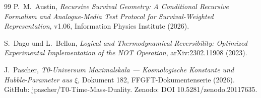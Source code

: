 \begin{thebibliography}{99}
P.~M.~Austin,
\textit{Recursive Survival Geometry: A Conditional Recursive Formalism
and Analogue-Media Test Protocol for Survival-Weighted Representation},
v1.06, Information Physics Institute (2026).

S.~Dago und L.~Bellon,
\textit{Logical and Thermodynamical Reversibility: Optimized Experimental
Implementation of the NOT Operation},
arXiv:2302.11908 (2023).

J.~Pascher,
\textit{T0-Universum Maximalskala — Kosmologische Konstante und Hubble-Parameter
aus $\xi$},
Dokument 182, FFGFT-Dokumentenserie (2026).
GitHub: jpascher/T0-Time-Mass-Duality.
Zenodo: DOI 10.5281/zenodo.20117635.

\end{thebibliography}

